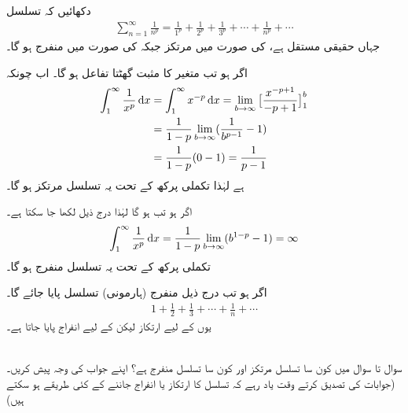 دکھائیں کہ  تسلسل  
\begin{align}
\sum_{n=1}^{\infty}\frac{1}{n^p}=\frac{1}{1^p}+\frac{1}{2^p}+\frac{1}{3^p}+\cdots+\frac{1}{n^p}+\cdots
\end{align}
جہاں  حقیقی مستقل ہے،  کی صورت میں مرتکز جبکہ  کی صورت میں منفرج ہو گا۔

اگر  ہو تب  متغیر  کا مثبت گھٹتا تفاعل ہو گا۔ اب چونکہ
\begin{align*}
\int_1^{\infty}\frac{1}{x^p}\dif x&=\int_1^{\infty}x^{-p}\dif x=\lim_{b\to\infty}\big[\frac{x^{-p+1}}{-p+1}\big]_1^b\\
&=\frac{1}{1-p}\lim_{b\to\infty}(\frac{1}{b^{p-1}}-1)\\
&=\frac{1}{1-p}(0-1)=\frac{1}{p-1}
\end{align*}
ہے لہٰذا تکملی پرکھ کے تحت یہ تسلسل مرتکز ہو گا۔

اگر ہو تب  ہو گا لہٰذا درج ذیل لکھا جا سکتا ہے۔
\begin{align*}
\int_1^{\infty}\frac{1}{x^p}\dif x=\frac{1}{1-p}\lim_{b\to\infty}(b^{1-p}-1)=\infty
\end{align*}
تکملی پرکھ کے تحت یہ تسلسل منفرج ہو گا۔

اگر  ہو تب درج ذیل منفرج (ہارمونی) تسلسل پایا جائے گا۔
\begin{align*}
1+\frac{1}{2}+\frac{1}{3}+\cdots+\frac{1}{n}+\cdots
\end{align*} 
یوں  کے لیے ارتکاز  لیکن   کے لیے انفراج پایا جاتا ہے۔


\\
سوال  تا سوال  میں کون سا تسلسل مرتکز اور کون سا تسلسل منفرج ہے؟ اپنے جواب کی وجہ پیش کریں۔(جوابات  کی تصدیق کرتے وقت   یاد رہے کہ تسلسل کا ارتکاز یا انفراج جاننے کے کئی طریقے ہو سکتے ہیں)

